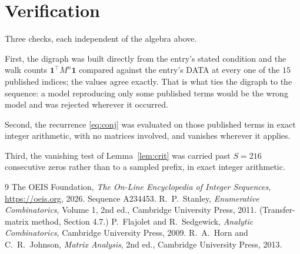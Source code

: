 \documentclass[11pt,a4paper]{article}
\theoremstyle{plain}
\theoremstyle{definition}
\begin{document}
\section{Verification}

Three checks, each independent of the algebra above.

First, the digraph was built directly from the entry's stated condition and the walk counts
$\mathbf{1}^{\!\top}M^{n}\mathbf{1}$ compared against the entry's DATA at every one of
the $15$ published indices; the values agree exactly. That is what ties the digraph to
the sequence: a model reproducing only some published terms would be the wrong model and
was rejected wherever it occurred.

Second, the recurrence \eqref{eq:conj} was evaluated on those published terms in exact
integer arithmetic, with no matrices involved, and vanishes wherever it applies.

Third, the vanishing test of Lemma~\ref{lem:crit} was carried past $S=216$ consecutive
zeros rather than to a sampled prefix, in exact integer arithmetic.

\begin{thebibliography}{9}
 The OEIS Foundation, \emph{The On-Line Encyclopedia of Integer
Sequences}, \url{https://oeis.org}, 2026. Sequence A234453.
 R.~P.~Stanley, \emph{Enumerative Combinatorics}, Volume 1, 2nd ed.,
Cambridge University Press, 2011. (Transfer-matrix method, Section 4.7.)
 P.~Flajolet and R.~Sedgewick, \emph{Analytic Combinatorics}, Cambridge
University Press, 2009.
 R.~A.~Horn and C.~R.~Johnson, \emph{Matrix Analysis}, 2nd ed., Cambridge
University Press, 2013.
\end{thebibliography}
\end{document}
